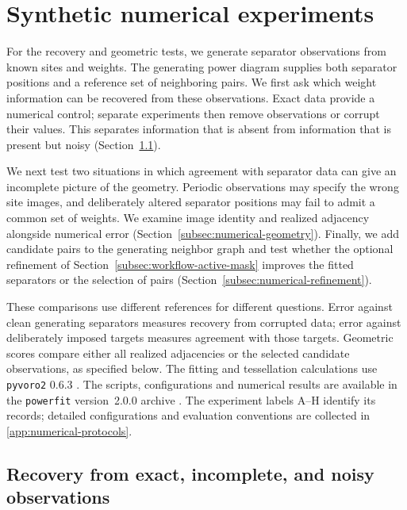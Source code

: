 \section{Synthetic numerical experiments}
\label{sec:numerical-experiments}

For the recovery and geometric tests, we generate separator observations from known sites and weights. The generating power diagram supplies both separator positions and a reference set of neighboring pairs. We first ask which weight information can be recovered from these observations. Exact data provide a numerical control; separate experiments then remove observations or corrupt their values. This separates information that is absent from information that is present but noisy (Section~\ref{subsec:numerical-accuracy}).

We next test two situations in which agreement with separator data can give an incomplete picture of the geometry. Periodic observations may specify the wrong site images, and deliberately altered separator positions may fail to admit a common set of weights. We examine image identity and realized adjacency alongside numerical error (Section~\ref{subsec:numerical-geometry}). Finally, we add candidate pairs to the generating neighbor graph and test whether the optional refinement of Section~\ref{subsec:workflow-active-mask} improves the fitted separators or the selection of pairs (Section~\ref{subsec:numerical-refinement}).

These comparisons use different references for different questions. Error against clean generating separators measures recovery from corrupted data; error against deliberately imposed targets measures agreement with those targets. Geometric scores compare either all realized adjacencies or the selected candidate observations, as specified below. The fitting and tessellation calculations use \texttt{pyvoro2} 0.6.3 \citep{Pyvoro2_063}. The scripts, configurations and numerical results are available in the \texttt{powerfit} version~2.0.0 archive \citep{PowerfitArchive2026}. The experiment labels A--H identify its records; detailed configurations and evaluation conventions are collected in \ref{app:numerical-protocols}.

\subsection{Recovery from exact, incomplete, and noisy observations}
\label{subsec:numerical-accuracy}

